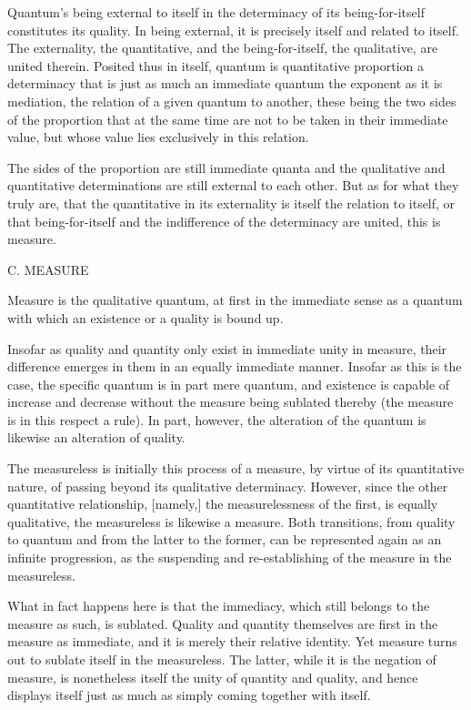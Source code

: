 Quantum's being external to itself in the determinacy of
its being-for-itself constitutes its quality.
In being external, it is precisely itself and related to itself.
The externality, the quantitative,
and the being-for-itself, the qualitative,
are united therein.
Posited thus in itself, quantum is quantitative proportion
a determinacy that is just as much an immediate quantum
the exponent as it is mediation,
the relation  of a given quantum to another,
these being the two sides of the proportion
that at the same time are not to be taken
in their immediate value,
but whose value lies exclusively in this relation.

The sides of the proportion are still immediate quanta
and the qualitative and quantitative determinations are
still external to each other.
But as for what they truly are,
that the quantitative in its externality is
itself the relation to itself,
or that being-for-itself and the indifference
of the determinacy are united,
this is measure.

C. MEASURE

Measure is the qualitative quantum,
at first in the immediate sense as a quantum
with which an existence or a quality is bound up.

Insofar as quality and quantity only exist in immediate unity in measure,
their difference emerges in them in an equally immediate manner.
Insofar as this is the case, the specific quantum is in part mere quantum,
and existence is capable of increase and decrease without the measure
being sublated thereby (the measure is in this respect a rule).
In part, however, the alteration of the quantum is
likewise an alteration of quality.

The measureless is initially this process of a measure,
by virtue of its quantitative nature,
of passing beyond its qualitative determinacy.
However, since the other quantitative relationship, [namely,]
the measurelessness of the first,
is equally qualitative,
the measureless is likewise a measure.
Both transitions, from quality to quantum
and from the latter to the former,
can be represented again as an infinite progression,
as the suspending and re-establishing of
the measure in the measureless.

What in fact happens here is that the immediacy,
which still belongs to the measure as such, is sublated.
Quality and quantity themselves are first
in the measure as immediate,
and it is merely their relative identity.
Yet measure turns out to sublate itself in the measureless.
The latter, while it is the negation of measure,
is nonetheless itself the unity of quantity and quality,
and hence displays itself just as much as
simply coming together with itself.

